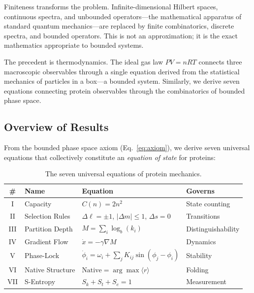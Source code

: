 \documentclass[aps,prx,superscriptaddress,twocolumn,10pt,a4paper,longbibliography,preprint]{revtex4-2}
\newcommand{\orderp}{\langle r \rangle}
\theoremstyle{definition}
\theoremstyle{remark}
\begin{document}
Finiteness transforms the problem. Infinite-dimensional Hilbert spaces, continuous spectra, and unbounded operators---the mathematical apparatus of standard quantum mechanics---are replaced by finite combinatorics, discrete spectra, and bounded operators. This is not an approximation; it is the exact mathematics appropriate to bounded systems.

The precedent is thermodynamics. The ideal gas law $PV = nRT$ connects three macroscopic observables through a single equation derived from the statistical mechanics of particles in a box---a bounded system. Similarly, we derive seven equations connecting protein observables through the combinatorics of bounded phase space.

\subsection{Overview of Results}
\label{sec:overview}

From the bounded phase space axiom (Eq.~\ref{eq:axiom}), we derive seven universal equations that collectively constitute an \emph{equation of state} for proteins:

\begin{table}[h]
\centering
\caption{The seven universal equations of protein mechanics.}
\label{tab:seven_equations}
\begin{tabular}{clll}
\toprule
\# & Name & Equation & Governs \\
\midrule
I & Capacity & $C(n) = 2n^2$ & State counting \\
II & Selection Rules & $\Delta\ell = \pm 1$, $|\Delta m| \leq 1$, $\Delta s = 0$ & Transitions \\
III & Partition Depth & $M = \sum_i \log_b(k_i)$ & Distinguishability \\
IV & Gradient Flow & $\dot{x} = -\gamma \nabla M$ & Dynamics \\
V & Phase-Lock & $\dot{\phi}_i = \omega_i + \sum_j K_{ij}\sin(\phi_j - \phi_i)$ & Stability \\
VI & Native Structure & $\text{Native} = \arg\max\orderp$ & Folding \\
VII & S-Entropy & $S_k + S_t + S_e = 1$ & Measurement \\
\bottomrule
\end{tabular}
\end{table}
\end{document}
